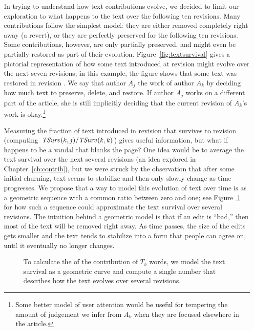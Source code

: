 In trying to understand how text contributions evolve, we decided
to limit our exploration to what happens to the text over the
following ten revisions.
Many contributions follow the simplest model: they are either
removed completely right away (a revert), or they are perfectly
preserved for the following ten revisions.
Some contributions, however, are only partially preserved, and
might even be partially restored as part of their evolution.
Figure~\ref{fig:textsurvival} gives a pictorial representation
of how some text introduced at revision  might
evolve over the next seven revisions; in this example, the
figure shows that some text was restored in revision .
We say that author $A_j$  the work of author
$A_k$ by deciding how much text to preserve, delete, and restore.
If author $A_j$ works on a different part of the article, she
is still implicitly deciding that the current revision of
$A_k$'s work is okay.\footnote{Some better model of
user attention would be useful for tempering the amount
of judgement we infer from
$A_k$ when they are focused elsewhere in the article.}

Measuring the fraction of text introduced in
revision  that survives to revision 
(\ie computing $\mathit{TSurv}_{}(k,j) / \mathit{TSurv}_{}(k,k)$)
gives useful information, but what if  happens to be
a vandal that blanks the page?
One idea would be to average the text survival over the next
several revisions (an idea explored in Chapter~\ref{ch:contrib}),
but we were struck by the observation that after some initial
churning, text seems to stabilize and then only slowly change
as time progresses.
We propose that a way to model this evolution of text over time
is as a geometric sequence with a common ratio between zero and one;
see Figure~\ref{fig:textlongevity} for how such a sequence could
approximate the text survival over several revisions.
The intuition behind a geometric model is that if an edit is
``bad,'' then most of the text will be removed right away.
As time passes, the size of the edits gets smaller and
the text tends to stabilize into a form
that people can agree on, until it eventually no longer changes.


\begin{figure}[tbph]
\centering
{}
\caption{
    To calculate the  of the contribution
    of $T_k$ words, we model the text survival as a geometric curve
    and compute a single number that describes how the text evolves
    over several revisions.}
\label{fig:textlongevity}
\end{figure}

